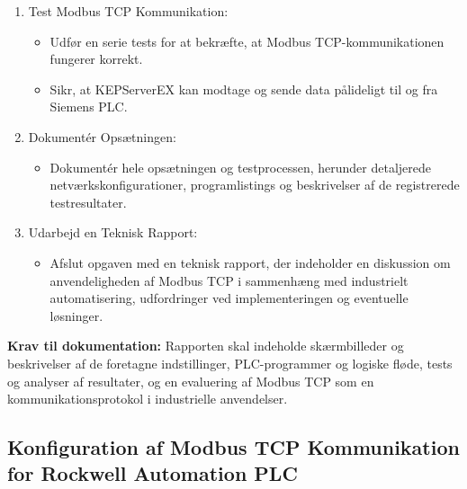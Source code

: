 \begin{enumerate}
\begin{itemize}
	\end{itemize}
	\item Test Modbus TCP Kommunikation:
	\begin{itemize}
		\item Udfør en serie tests for at bekræfte, at Modbus TCP-kommunikationen fungerer korrekt.
		\item Sikr, at KEPServerEX kan modtage og sende data pålideligt til og fra Siemens PLC.
	\end{itemize}
	\item Dokumentér Opsætningen:
	\begin{itemize}
		\item Dokumentér hele opsætningen og testprocessen, herunder detaljerede netværkskonfigurationer, programlistings og beskrivelser af de registrerede testresultater.
	\end{itemize}
	\item Udarbejd en Teknisk Rapport:
	\begin{itemize}
		\item Afslut opgaven med en teknisk rapport, der indeholder en diskussion om anvendeligheden af Modbus TCP i sammenhæng med industrielt automatisering, udfordringer ved implementeringen og eventuelle løsninger.
	\end{itemize}
\end{enumerate}
\textbf{Krav til dokumentation:} Rapporten skal indeholde skærmbilleder og beskrivelser af de foretagne indstillinger, PLC-programmer og logiske fløde, tests og analyser af resultater, og en evaluering af Modbus TCP som en kommunikationsprotokol i industrielle anvendelser.

\subsection*{Konfiguration af Modbus TCP Kommunikation for Rockwell Automation PLC}
\label{subsec:modbus_tcp_comm_rockwell}

